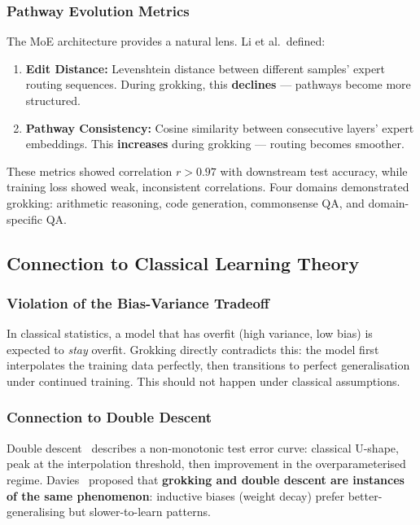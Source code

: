 \documentclass[11pt, a4paper]{article}
\theoremstyle{definition}
\theoremstyle{plain}
\begin{document}
\subsubsection{Pathway Evolution Metrics}

The MoE architecture provides a natural lens. Li et al.\ defined:
\begin{enumerate}
  \item \textbf{Edit Distance:} Levenshtein distance between different samples' expert routing sequences. During grokking, this \textbf{declines} --- pathways become more structured.
  \item \textbf{Pathway Consistency:} Cosine similarity between consecutive layers' expert embeddings. This \textbf{increases} during grokking --- routing becomes smoother.
\end{enumerate}

These metrics showed correlation $r > 0.97$ with downstream test accuracy, while training loss showed weak, inconsistent correlations. Four domains demonstrated grokking: arithmetic reasoning, code generation, commonsense QA, and domain-specific QA.

\subsection{Connection to Classical Learning Theory}
\label{subsec:biasvariance}

\subsubsection{Violation of the Bias-Variance Tradeoff}

In classical statistics, a model that has overfit (high variance, low bias) is expected to \emph{stay} overfit. Grokking directly contradicts this: the model first interpolates the training data perfectly, then transitions to perfect generalisation under continued training. This should not happen under classical assumptions.

\subsubsection{Connection to Double Descent}

Double descent~\cite{belkin2018reconciling} describes a non-monotonic test error curve: classical U-shape, peak at the interpolation threshold, then improvement in the overparameterised regime. Davies~\cite{davies2023grokking} proposed that \textbf{grokking and double descent are instances of the same phenomenon}: inductive biases (weight decay) prefer better-generalising but slower-to-learn patterns.
\end{document}
